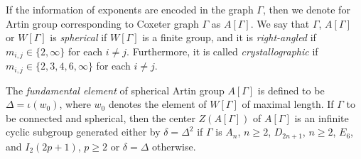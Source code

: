 \documentclass[12pt]{amsart}
\theoremstyle{definition}
\numberwithin{equation}{section}
\begin{document}
 If the information of exponents are encoded in the graph $\Gamma$, then we denote for Artin group corresponding to Coxeter graph $\Gamma$ as $A[\Gamma]$.  We say that $\Gamma$, $A[\Gamma]$ or $W[\Gamma]$ is {\it spherical} if $W[\Gamma]$ is a finite group, and it is {\it right-angled} if $m_{i,j} \in \{2,\infty\} $ for each $i\neq j$. Furthermore, it is called {\it crystallographic} if $m_{i,j}\in\{2,3,4,6,\infty\}$ for each $i\neq j$.

The {\it fundamental element} of spherical Artin group $A[\Gamma]$ is defined to be $\Delta= \iota(w_0)$, where $w_0$ denotes the element of $W[\Gamma]$ of maximal length. 
If $\Gamma$ to be connected and spherical, then the center $Z(A[\Gamma])$ of $A[\Gamma]$ is an infinite cyclic subgroup generated either by $\delta= \Delta^2$ if $\Gamma$ is $A_n$, $n\ge 2$, $D_{2n+1}$, $n\ge 2$,  $E_6$, and $I_2(2p+1)$, $p\ge 2$ or $\delta=  \Delta$ otherwise.
\end{document}
